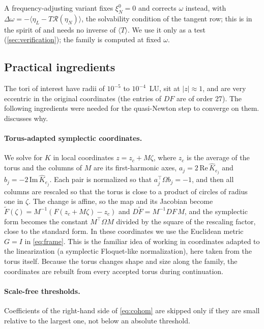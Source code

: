 \documentclass[11pt]{article}
\newcommand{\avg}[1]{\langle #1 \rangle}
\begin{document}
A frequency-adjusting variant fixes $\xi_N^0=0$ and corrects $\omega$ instead, with
$\Delta\omega = -\avg{\eta_L - T\mathcal{R}(\eta_N)}$, the solvability condition of the tangent
row; this is in the spirit of \cite[Sec.~6.1, eqs.~(6.1)--(6.6), p.~45]{haroluque2019partially}
and needs no inverse of $\avg{T}$. We use it only as a test (\cref{sec:verification}); the family
is computed at fixed $\omega$.

\subsection{Practical ingredients}\label{sec:practical}
The tori of interest have radii of $10^{-5}$ to $10^{-4}$~LU, sit at $|z|\approx 1$, and are very
eccentric in the original coordinates (the entries of $DF$ are of order 27). The following
ingredients were needed for the quasi-Newton step to converge on them. 
discusses why.

\paragraph{Torus-adapted symplectic coordinates.} We solve for $K$ in local coordinates
$z = z_c + M\zeta$, where $z_c$ is the average of the torus and the columns of $M$ are its
first-harmonic axes, $a_j = 2\,\mathrm{Re}\,\widehat{K}_{e_j}$ and
$b_j = -2\,\mathrm{Im}\,\widehat{K}_{e_j}$. Each pair is normalized so that
$a_j^\top\Omega b_j = -1$, and then all columns are rescaled so that the torus is close to a
product of circles of radius one in $\zeta$. The change is affine, so the map and its Jacobian
become $\tilde F(\zeta) = M^{-1}(F(z_c+M\zeta)-z_c)$ and $D\tilde F = M^{-1}DF\,M$, and the
symplectic form becomes the constant $M^\top\Omega M$ divided by the square of the rescaling
factor, close to the standard form. In these coordinates we use the Euclidean metric $G=I$ in
\eqref{eq:frame}. This is the familiar idea of working in coordinates adapted to the linearization
(a symplectic Floquet-like normalization), here taken from the torus itself. Because the torus
changes shape and size along the family, the coordinates are rebuilt from every accepted torus
during continuation.

\paragraph{Scale-free thresholds.} Coefficients of the right-hand side of \eqref{eq:cohom} are
skipped only if they are small relative to the largest one, not below an absolute threshold.
\end{document}
